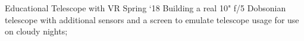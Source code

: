 \project
    {Educational Telescope with VR}
    {Spring `18}
    {
        Building a real 10" f/5 Dobsonian telescope with additional sensors and a screen to emulate
        telescope usage for use on cloudy nights;
    }
